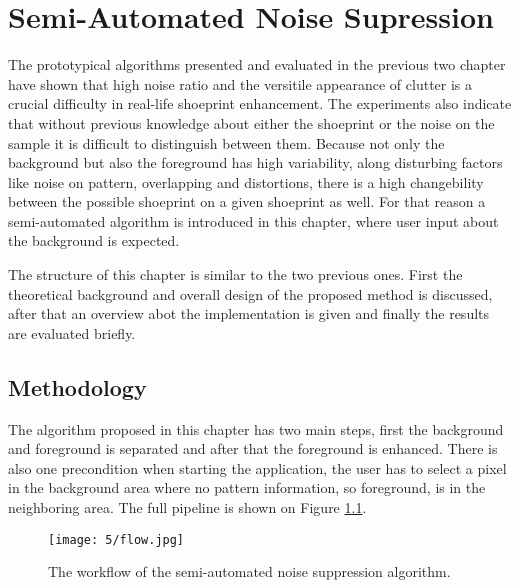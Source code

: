 \documentclass[draft,final]{vutinfth} %
\begin{document}
\chapter{Semi-Automated Noise Supression}
\par
The prototypical algorithms presented and evaluated in the previous two chapter have shown that high noise ratio and the versitile appearance of clutter is a crucial difficulty in real-life shoeprint enhancement.
The experiments also indicate that without previous knowledge about either the shoeprint or the noise on the sample it is difficult to distinguish between them.
Because not only the background but also the foreground has high variability, along disturbing factors like noise on pattern, overlapping and distortions, there is a high changebility between the possible shoeprint on a given shoeprint as well.
For that reason a semi-automated algorithm is introduced in this chapter, where user input about the background is expected.
\par
The structure of this chapter is similar to the two previous ones.
First the theoretical background and overall design of the proposed method is discussed, after that an overview abot the implementation is given and finally the results are evaluated briefly.

\section{Methodology}
\par
The algorithm proposed in this chapter has two main steps, first the background and foreground is separated and after that the foreground is enhanced.
There is also one precondition when starting the application, the user has to select a pixel in the background area where no pattern information, so foreground, is in the neighboring area.
The full pipeline is shown on Figure \ref{fig:sans:workflow}.

\begin{figure}[h]
  \centering
  \texttt{[image: 5/flow.jpg]}
  \caption{The workflow of the semi-automated noise suppression algorithm.}
  \label{fig:sans:workflow} %
\end{figure}
\end{document}
